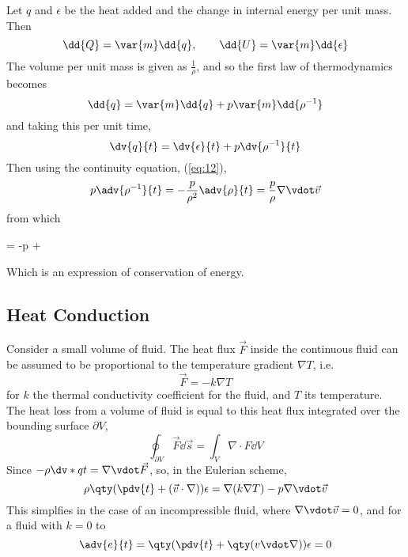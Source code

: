 Let $q$ and $\epsilon$ be the heat added and the change in internal energy per unit mass. Then
\[ \dd{Q} = \var{m} \dd{q}, \qquad \dd{U} = \var{m} \dd{\epsilon} \]
The volume per unit mass is given as $\frac{1}{\rho}$, and so the first law of thermodynamics becomes
\begin{equation}
  \label{eq:23}
  \dd{q} = \var{m} \dd{q} + p \var{m} \dd{\rho^{-1}}
\end{equation}
and taking this per unit time,
\begin{equation}
  \label{eq:24}
  \dv{q}{t} = \dv{\epsilon}{t} + p \dv{\rho^{-1}}{t} 
\end{equation}
Then using the continuity equation, (\ref{eq:12}),
\begin{equation}
  \label{eq:25}
  p \adv{\rho^{-1}}{t} = - \frac{p}{\rho^2} \adv{\rho}{t} = \frac{p}{\rho} \nabla \vdot \vec{v}
\end{equation}
from which
\begin{fequation}
  \label{eq:26}
  \rho {} = -p \nabla \vdot {} + \rho {}
\end{fequation}
Which is an expression of conservation of energy.

\subsection{Heat Conduction}
\label{sec:heat-conduction}

Consider a small volume of fluid. The heat flux $\vec{F}$ inside the continuous fluid can be assumed to be proportional to the temperature gradient $\nabla T$, i.e.
\begin{equation}
  \label{eq:27}
  \vec{F} = - k \nabla T
\end{equation}
for $k$ the thermal conductivity coefficient for the fluid, and $T$
its temperature. The heat loss from a volume of fluid is equal to this heat flux integrated over the bounding surface $\partial V$,
\begin{equation}
  \label{eq:28}
  \oint_{\partial V} \vec{F} \dd{\vec{s}} = \int_V \nabla \cdot F \dd{V}
\end{equation}
Since $- \rho \dv*{q}{t} = \nabla \vdot \vec{F}$, so, in the Eulerian scheme,
\begin{equation}
  \label{eq:29}
  \rho \qty( \pdv{t} + ( \vec{v} \cdot \nabla) ) \epsilon = \nabla (k \nabla T) - p \nabla \vdot \vec{v}
\end{equation}
This simplfies in the case of an incompressible fluid, where $\nabla \vdot \vec{v} = 0$, and for a fluid with $k=0$ to
\begin{equation}
  \label{eq:30}
  \adv{e}{t} = \qty( \pdv{t} + \qty( v \vdot \nabla ) ) \epsilon = 0
\end{equation}

